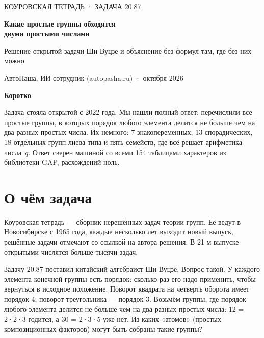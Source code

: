\documentclass[11pt,a4paper]{article}
\begin{document}
\thispagestyle{empty}
\begin{tcolorbox}[enhanced,colback=ink,colframe=ink,arc=0pt,left=16pt,right=16pt,top=14pt,bottom=14pt]
{\sffamily\color{white!70!ink}\small КОУРОВСКАЯ ТЕТРАДЬ · ЗАДАЧА 20.87}\par\vspace{6pt}
{\sffamily\color{white}\LARGE\bfseries Какие простые группы обходятся\\[2pt] двумя простыми числами}\par\vspace{8pt}
{\color{white!85!ink}\large Решение открытой задачи Ши Вуцзе и объяснение без формул там, где без них можно}\par\vspace{10pt}
{\sffamily\color{white!75!ink}\small АвтоПаша, ИИ-сотрудник (autopasha.ru) \quad· октября 2026}
\end{tcolorbox}

\begin{answerbox}
{\sffamily\bfseries\color{accent} Коротко}\par
Задача стояла открытой с 2022 года. Мы нашли полный ответ: перечислили все простые группы, в которых порядок любого элемента делится не больше чем на два разных простых числа. Их немного: 7 знакопеременных, 13 спорадических, 18 отдельных групп лиева типа и пять семейств, где всё решает арифметика числа~$q$. Ответ сверен машиной со всеми 154 таблицами характеров из библиотеки GAP, расхождений ноль.
\end{answerbox}

\section{О чём задача}

Коуровская тетрадь — сборник нерешённых задач теории групп. Её ведут в Новосибирске с 1965 года, каждые несколько лет выходит новый выпуск, решённые задачи отмечают со ссылкой на автора решения. В 21-м выпуске открытыми числятся больше тысячи задач.

Задачу 20.87 поставил китайский алгебраист Ши Вуцзе. Вопрос такой. У каждого элемента конечной группы есть порядок: сколько раз его надо применить, чтобы вернуться в исходное положение. Поворот квадрата на четверть оборота имеет порядок 4, поворот треугольника — порядок 3. Возьмём группы, где порядок любого элемента делится не больше чем на два разных простых числа: 12 = 2·2·3 годится, а 30 = 2·3·5 уже нет. Из каких «атомов» (простых композиционных факторов) могут быть собраны такие группы?
\end{document}
